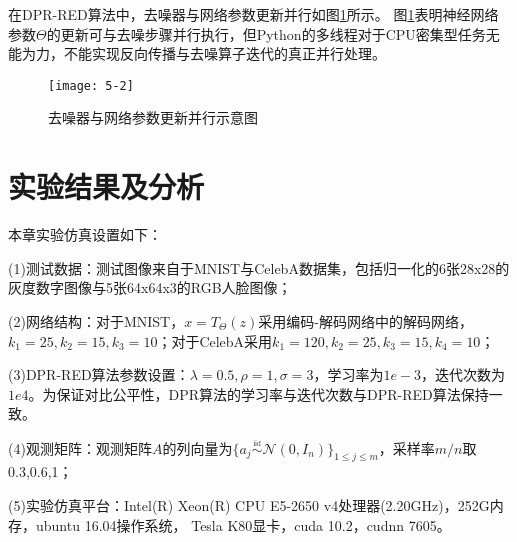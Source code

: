 在DPR-RED算法中，去噪器与网络参数更新并行如图\ref{fig:5-2}所示。
图\ref{fig:5-2}表明神经网络参数$\Theta$的更新可与去噪步骤并行执行，但Python的多线程对于CPU密集型任务无能为力，不能实现反向传播与去噪算子迭代的真正并行处理。
\begin{figure}[!hptb]
	\centering
	\texttt{[image: 5-2]}
	\caption{去噪器与网络参数更新并行示意图}
	\label{fig:5-2}
\end{figure}

\section{实验结果及分析}
本章实验仿真设置如下：

(1)测试数据：测试图像来自于MNIST与CelebA数据集，包括归一化的6张28x28的灰度数字图像与5张64x64x3的RGB人脸图像；

(2)网络结构：对于MNIST，$x=T_{\Theta}(z)$采用编码-解码网络中的解码网络，$k_1=25,k_2=15,k_3=10$；对于CelebA采用$k_1=120,k_2=25,k_3=15,k_4=10$；

(3)DPR-RED算法参数设置：$\lambda=0.5,\rho=1,\sigma=3$，学习率为$1e-3$，迭代次数为$1e4$。为保证对比公平性，DPR算法的学习率与迭代次数与DPR-RED算法保持一致。

(4)观测矩阵：观测矩阵$A$的列向量为$\{a_j\overset{\underset{\mathrm{iid}}{}}{\sim}\mathcal{N}(0,I_n)\}_{1\leq{j\leq{m}}}$，采样率$m/n$取0.3,0.6,1；

(5)实验仿真平台：Intel(R) Xeon(R) CPU E5-2650 v4处理器(2.20GHz)，252G内存，ubuntu 16.04操作系统， Tesla K80显卡，cuda 10.2，cudnn 7605。

